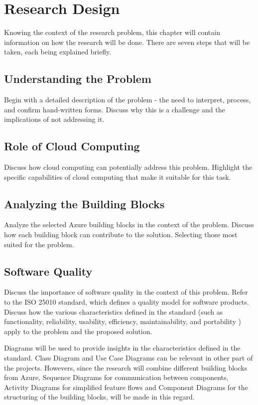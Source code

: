 \section{Research Design}

Knowing the context of the research problem,
this chapter will contain information on how the research will be done.
There are seven steps that will be taken,
each being explained briefly.

\subsection{Understanding the Problem}
Begin with a detailed description of the problem
- the need to interpret, process, and confirm hand-written forms.
Discuss why this is a challenge and the implications of not addressing it.

\subsection{Role of Cloud Computing}
Discuss how cloud computing can potentially address this problem.
Highlight the specific capabilities of cloud computing that make it suitable for this task.

\subsection{Analyzing the Building Blocks}
Analyze the selected Azure building blocks in the context of the problem.
Discuss how each building block can contribute to the solution.
Selecting those most suited for the problem.

\subsection{Software Quality}
Discuss the importance of software quality in the context of this problem.
Refer to the ISO 25010 standard, which defines a quality model for software products.
Discuss how the various characteristics defined in the standard
(such as functionality, reliability, usability, efficiency, maintainability, and portability \cite{ISO25010})
apply to the problem and the proposed solution.

Diagrams will be used to provide insights in the characteristics defined in the standard.
Class Diagram and Use Case Diagrams can be relevant in other part of the projects.
Howevers, since the research will combine different building blocks from Azure,
Sequence Diagrams for communication between components, Activity Diagrams for simplified
feature flows and Component Diagrams for the structuring of the building blocks,
will be made in this regard.

